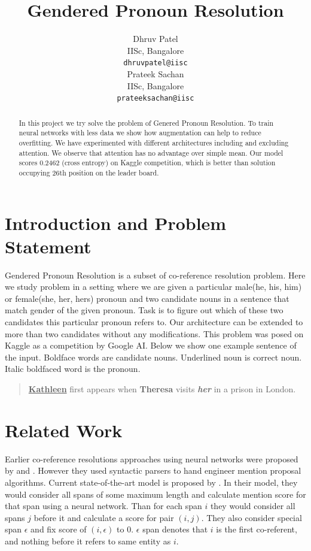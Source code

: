 \documentclass[11pt,a4paper]{article}
\title{Gendered Pronoun Resolution}
\author{Dhruv Patel \\
  IISc, Bangalore \\
  \texttt{dhruvpatel@iisc} \\\And
  Prateek Sachan \\
  IISc, Bangalore \\
  \texttt{prateeksachan@iisc} \\}
\date{}
\begin{document}
\maketitle
\begin{abstract}
  In this project we try solve the problem of Genered  Pronoun Resolution. To train neural networks with less data we show how augmentation can help to reduce overfitting. We have experimented with different architectures including and excluding attention. We observe that attention has no advantage over simple mean. Our model scores 0.2462 (cross entropy) on Kaggle competition, which is better than solution occupying 26th position on the leader board.
\end{abstract}

\section{Introduction and Problem Statement}
Gendered Pronoun Resolution is a subset of co-reference resolution problem. Here we study problem in a setting where we are given a particular male(he, his, him) or female(she, her, hers) pronoun and two candidate nouns in a sentence that match gender of the given pronoun. Task is to figure out which of these two candidates this particular pronoun refers to.  Our architecture can be extended to more than two candidates without any modifications. This problem was posed on Kaggle as a competition by Google AI. Below we show one example sentence of the input. Boldface words are candidate nouns. Underlined noun is correct noun. Italic boldfaced word is the pronoun.
\begin{quote}
   \textbf{\underline{Kathleen}} first appears when \textbf{Theresa} visits \textbf{\textit{her}} in a prison in London.
\end{quote}

\section{Related Work}
Earlier co-reference resolutions approaches using neural networks were proposed by \cite{wiseman2016learning} and \cite{clarkmanning2016deep}. However they used syntactic parsers to hand engineer mention proposal algorithms. Current state-of-the-art model is proposed by \cite{lee2017end}. In their model, they would consider all spans of some maximum length and calculate mention score for that span using a neural network. Than for each span $i$ they would consider all spans $j$ before it and calculate a score for pair $(i, j)$. They also consider special span $\epsilon$ and fix score of $(i, \epsilon)$ to 0. $\epsilon$ span denotes that $i$ is the first co-referent, and nothing before it refers to same entity as $i$.
\end{document}
